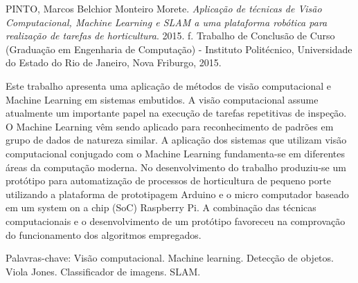 \begin{resumo}

\noindent
PINTO, Marcos Belchior Monteiro Morete. \textit{Aplicação de técnicas de Visão Computacional, Machine Learning e SLAM a uma plataforma robótica para realização de tarefas de horticultura}. 2015. \pageref{LastPage} f. Trabalho de Conclusão de Curso (Graduação em Engenharia de Computação) - Instituto Politécnico, Universidade do Estado do Rio de Janeiro, Nova Friburgo, 2015.
\vspace{\onelineskip}

\setlength{\parindent}{1.3cm}
Este trabalho apresenta uma aplicação de métodos de visão computacional e Machine Learning em sistemas embutidos. A visão computacional assume atualmente um importante papel na execução de tarefas repetitivas de inspeção. O Machine Learning vêm sendo aplicado para reconhecimento de padrões em grupo de dados de natureza similar. A aplicação dos sistemas que utilizam visão computacional conjugado com o Machine Learning fundamenta-se  em diferentes áreas da computação moderna. No desenvolvimento do trabalho produziu-se um protótipo para automatização de processos de horticultura de pequeno porte utilizando a plataforma de prototipagem Arduino e o micro computador baseado em um system on a chip (SoC) Raspberry Pi. A combinação das técnicas computacionais e o desenvolvimento de um protótipo favoreceu na comprovação do funcionamento dos algoritmos empregados.		

\vspace{\onelineskip}
\noindent Palavras-chave: Visão computacional. Machine learning. Detecção de objetos. Viola Jones. Classificador de imagens. SLAM.

\end{resumo}